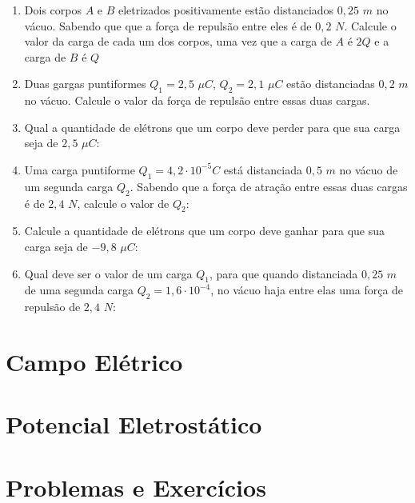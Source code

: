 \documentclass[12pt,a4paper]{book}
\begin{document}
\begin{enumerate}
	\item Dois corpos $A$ e $B$ eletrizados positivamente estão distanciados $0,25$ $m$ no vácuo. Sabendo que que a força de repulsão entre eles é de $0,2$ $N$. Calcule o valor da carga de cada um dos corpos, uma vez que a carga de $A$ é $2Q$ e a carga de $B$ é $Q$
	
	\item Duas gargas puntiformes $Q_{1}=2,5$ $\mu C$, $Q_{2}=2,1$ $\mu C$ estão distanciadas $0,2$ $m$ no vácuo. Calcule o valor da força de repulsão entre essas duas cargas. 
	
	\item Qual a quantidade de elétrons que um corpo deve perder para que sua carga seja de $2,5$ $\mu C$:
	
	\item Uma carga puntiforme $Q_{1} = 4,2 \cdot 10^{-5}C$ está distanciada $0,5$ $m$ no vácuo de um segunda carga $Q_{2}$. Sabendo que a força de atração entre essas duas cargas é de $2,4$ $N$, calcule o valor de $Q_{2}$:
	
	\item Calcule a quantidade de elétrons que um corpo deve ganhar para que sua carga seja de $-9,8$ $\mu C$:
	
	\item Qual deve ser o valor de um carga $Q_{1}$, para que quando distanciada $0,25$ $m$ de uma segunda carga $Q_{2} = 1,6 \cdot 10^{-4}$, no vácuo haja entre elas uma força de repulsão de $2,4$ $N$:

	\end{enumerate}
	
	\newpage \section{Campo Elétrico}
		\section{Potencial Eletrostático}
		
		\newpage \section{Problemas e Exercícios}	
		
\end{document}
